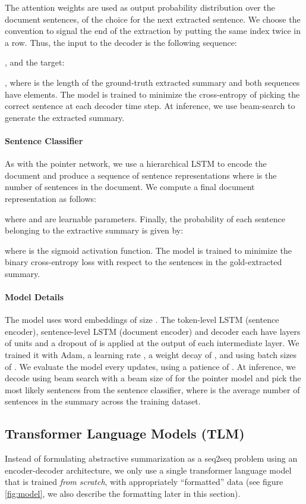 \documentclass[letterpaper]{article} \usepackage{arXiv_V2_aaai_sty_mods}  \usepackage{times}  \usepackage{helvet} \usepackage{courier}  \usepackage[hyphens]{url}  \usepackage{graphicx} \usepackage[utf8]{inputenc} \usepackage[T1]{fontenc}    \usepackage{url}            \usepackage{booktabs}       \usepackage{amsfonts}       \usepackage{nicefrac}       \usepackage{multirow}
\begin{document}
The attention weights  are used as output probability distribution over the document sentences, of the choice for the next extracted sentence.
We choose the convention to signal the end of the extraction by putting the same index twice in a row.
Thus, the input to the decoder is the following sequence:

, and the target:

, where  is the length of the ground-truth extracted summary and both sequences have  elements.
The model is trained to minimize the cross-entropy of picking the correct sentence at each decoder time step. At inference, we use beam-search to generate the extracted summary. 

\paragraph{Sentence Classifier}
As with the pointer network, we use a hierarchical LSTM to encode the document and produce a sequence of sentence representations  where  is the number of sentences in the document.
We compute a final document representation as follows:

where  and  are learnable parameters.
Finally, the probability of each sentence belonging to the extractive summary is given by:

where  is the sigmoid activation function. The model is trained to minimize the binary cross-entropy loss with respect to the sentences in the gold-extracted summary.

\paragraph{Model Details} The model uses word embeddings of size . The token-level LSTM (sentence encoder), sentence-level LSTM (document encoder) and decoder each have  layers of  units and a dropout of  is applied at the output of each intermediate layer. We trained it with Adam, a learning rate , a weight decay of , and using batch sizes of . We evaluate the model every  updates, using a patience of . At inference, we decode using beam search with a beam size of  for the pointer model and pick the  most likely sentences from the sentence classifier, where  is the average number of sentences in the summary across the training dataset.

\subsection{Transformer Language Models (TLM)}
\label{sec:gpt}
Instead of formulating abstractive summarization as a seq2seq problem using an encoder-decoder architecture, we only use a single transformer language model that is trained \textit{from scratch}, with appropriately ``formatted'' data (see figure \ref{fig:model}, we also describe the formatting later in this section).
\end{document}
